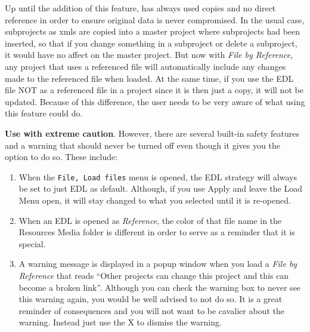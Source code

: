Up until the addition of this feature, \CGG{} has always used copies
and no direct reference in order to ensure original data is never
compromised.  In the usual case, subprojects as xmls are copied into
a master project where subprojects had been inserted, so that if you
change something in a subproject or delete a subproject, it would
have no affect on the master project.  But now with \textit{File by
  Reference}, any project that uses a referenced file will
automatically include any changes made to the referenced file when
loaded.  At the same time, if you use the EDL file NOT as a
referenced file in a project since it is then just a copy, it will
not be updated.  Because of this difference, the user needs to be
very aware of what using this feature could do.

\textbf{Use with extreme caution}.  However, there are several
built-in safety features and a warning that should never be turned
off even though it gives you the option to do so.  These include:

\begin{enumerate}
\item When the \texttt{File, Load files} menu is opened, the EDL
  strategy will always be set to just EDL as default.  Although, if
  you use Apply and leave the Load Menu open, it will stay changed to
  what you selected until it is re-opened.
\item When an EDL is opened as \textit{Reference}, the color of
  that file name in the Resources Media folder is different in order
  to serve as a reminder that it is special.
\item A warning message is displayed in a popup window when you
  load a \textit{File by Reference} that reads “Other projects can
  change this project and this can become a broken link”.  Although
  you can check the warning box to never see this warning again, you
  would be well advised to not do so.  It is a great reminder of
  consequences and you will not want to be cavalier about the warning.
  Instead just use the X to dismiss the warning.
\end{enumerate}

